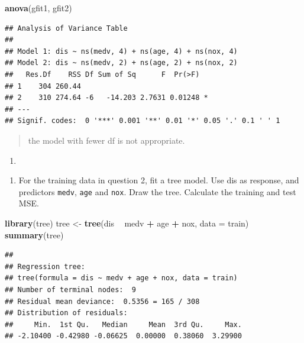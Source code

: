 \documentclass[]{article}
\newenvironment{Shaded}{\begin{snugshade}}{\end{snugshade}}
\newcommand{\DataTypeTok}[1]{\textcolor[rgb]{0.13,0.29,0.53}{#1}}
\newcommand{\KeywordTok}[1]{\textcolor[rgb]{0.13,0.29,0.53}{\textbf{#1}}}
\newcommand{\NormalTok}[1]{#1}
\newcommand{\OperatorTok}[1]{\textcolor[rgb]{0.81,0.36,0.00}{\textbf{#1}}}
\newcommand{\StringTok}[1]{\textcolor[rgb]{0.31,0.60,0.02}{#1}}
\providecommand{\tightlist}{%
  \setlength{\itemsep}{0pt}\setlength{\parskip}{0pt}}
\begin{document}
\begin{Shaded}
\begin{Highlighting}[]
\KeywordTok{anova}\NormalTok{(gfit1, gfit2)}
\end{Highlighting}
\end{Shaded}

\begin{verbatim}
## Analysis of Variance Table
## 
## Model 1: dis ~ ns(medv, 4) + ns(age, 4) + ns(nox, 4)
## Model 2: dis ~ ns(medv, 2) + ns(age, 2) + ns(nox, 2)
##   Res.Df    RSS Df Sum of Sq      F  Pr(>F)  
## 1    304 260.44                              
## 2    310 274.64 -6   -14.203 2.7631 0.01248 *
## ---
## Signif. codes:  0 '***' 0.001 '**' 0.01 '*' 0.05 '.' 0.1 ' ' 1
\end{verbatim}

\begin{quote}
the model with fewer df is not appropriate.
\end{quote}

\begin{enumerate}
\def\labelenumi{\arabic{enumi}.}
\setcounter{enumi}{3}
\item
\end{enumerate}

\begin{enumerate}
\def\labelenumi{(\alph{enumi})}
\tightlist
\item
  For the training data in question 2, fit a tree model. Use dis as
  response, and predictors \texttt{medv}, \texttt{age} and \texttt{nox}.
  Draw the tree. Calculate the training and test MSE.
\end{enumerate}

\begin{Shaded}
\begin{Highlighting}[]
\KeywordTok{library}\NormalTok{(tree)}
\NormalTok{tree <-}\StringTok{ }\KeywordTok{tree}\NormalTok{(dis }\OperatorTok{~}\StringTok{ }\NormalTok{medv }\OperatorTok{+}\StringTok{ }\NormalTok{age }\OperatorTok{+}\StringTok{ }\NormalTok{nox, }\DataTypeTok{data =}\NormalTok{ train)}
\KeywordTok{summary}\NormalTok{(tree)}
\end{Highlighting}
\end{Shaded}

\begin{verbatim}
## 
## Regression tree:
## tree(formula = dis ~ medv + age + nox, data = train)
## Number of terminal nodes:  9 
## Residual mean deviance:  0.5356 = 165 / 308 
## Distribution of residuals:
##     Min.  1st Qu.   Median     Mean  3rd Qu.     Max. 
## -2.10400 -0.42980 -0.06625  0.00000  0.38060  3.29900
\end{verbatim}
\end{document}
